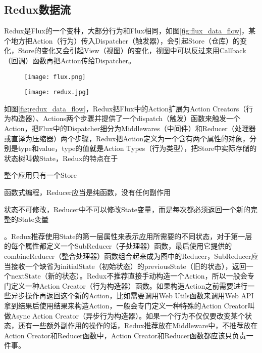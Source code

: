 \subsection{Redux数据流}
Redux是Flux的一个变种，大部分行为和Flux相同，如图\ref{fig:flux_data_flow}，某个地方把Action（行为）传入Dispatcher（触发器），会引起Store（仓库）的变化，Store的变化又会引起View（视图）的变化，视图中可以反过来用Callback（回调）函数再把Action传给Dispatcher。
\begin{figure}[!htp]
 \centering
 \texttt{[image: flux.png]}
\end{figure}

\begin{figure}[!htp]
 \centering
 \texttt{[image: redux.jpg]}
\end{figure}

如图\ref{fig:redux_data_flow}，Redux把Flux中的Action扩展为Action Creators（行为构造器）、Actions两个步骤并提供了一个dispatch（触发）函数来触发一个Action，把Flux中的Dispatcher细分为Middlewares（中间件）和Reducer（处理器或直译为压缩器）两个步骤，Redux把Action定义为一个含有两个属性的对象，分别是type和value，type的值就是Action Types（行为类型），把Store中实际存储的状态树叫做State，Redux的特点在于
\begin{enumerate*}
  \item 整个应用只有一个Store
  \item 函数式编程，Reducer应当是纯函数，没有任何副作用
  \item 状态不可修改，Reducer中不可以修改State变量，而是每次都必须返回一个新的完整的State变量
\end{enumerate*}。Redux推荐使用State的第一层属性来表示应用所需要的不同状态，对于第一层的每个属性都定义一个SubReducer（子处理器）函数，最后使用它提供的combineReducer（整合处理器）函数组合起来成为图中的Reducer，SubReducer应当接收一个缺省为initialState（初始状态）的previousState（旧的状态），返回一个nextState（新的状态）。Redux不推荐直接手动构造一个Action，所以一般会专门定义一种Action Creator（行为构造器）函数。如果构造Action之前需要进行一些异步操作再返回这个新的Action，比如需要调用Web Utils函数来调用Web API拿到结果后使用结果来构造Action，一般会专门定义一种特殊的Action Creator叫做Async Action Creator（异步行为构造器）。如果一个行为不仅仅要改变某个状态，还有一些额外副作用的操作的话，Redux推荐放在Middleware中，不推荐放在Action Creator和Reducer函数中，Action Creator和Reducer函数都应该只负责一件事。

